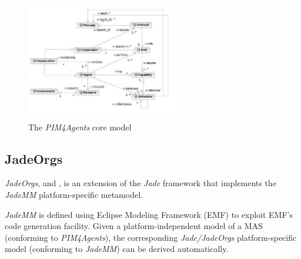 \begin{figure}[ht]
	\centering
	\includegraphics[width=0.6\textwidth]{images/pim4agents/pim4agents-metamodel.png}
	\caption{The \textit{PIM4Agents} core model \cite{Hahn07b}}
	\label{figure:pim4agents-metamodel}
\end{figure}

\subsection{JadeOrgs}

\textit{JadeOrgs}, \cite{Madrigal-Mora08} and \cite{Madrigal-Mora09}, is an extension of the \textit{Jade} framework that implements the \textit{JadeMM} platform-specific metamodel.

\textit{JadeMM} is defined using Eclipse Modeling Framework (EMF) to exploit EMF's code generation facility.
Given a platform-independent model of a MAS (conforming to \textit{PIM4Agents}), the corresponding \textit{Jade/JadeOrgs} platform-specific model (conforming to \textit{JadeMM}) can be derived automatically.
